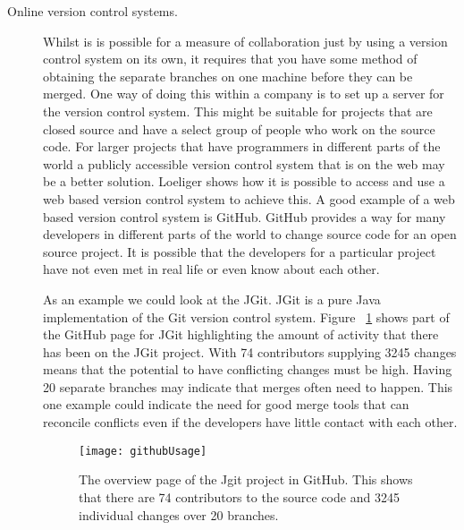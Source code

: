 \begin{description}
  \item [Online version control systems.]  
  Whilst is is possible for a measure of collaboration just by using a version control system on its own, it requires that you have some method of obtaining the separate branches on one machine before they can be merged.
  One way of doing this within a company is to set up a server for the version control system.
  This might be suitable for projects that are closed source and have a select group of people who work on the source code.
  For larger projects that have programmers in different parts of the world a publicly accessible version control system that is on the web may be a better solution.
  Loeliger \cite{Loeliger2006} shows how it is possible to access and use a web based version control system to achieve this.
  A good example of a web based version control system is GitHub.
  GitHub provides a way for many developers in different parts of the world to change source code for an open source project.
  It is possible that the developers for a particular project have not even met in real life or even know about each other.

  As an example we could look at the JGit.
  JGit is a pure Java implementation of the Git version control system.
  Figure ~\ref{fig:bgUsage} shows part of the GitHub page for JGit highlighting the amount of activity that there has been on the JGit project.
  With 74 contributors supplying 3245 changes means that the potential to have conflicting changes must be high. Having 20 separate branches may indicate that merges often need to happen. This one example could indicate the need for good merge tools that can reconcile conflicts even if the developers have little contact with each other.

  \begin{figure}[!t]
   \begin{center}
    \texttt{[image: githubUsage]}
   \end{center}
   \caption{The overview page of the Jgit project in GitHub. This shows that there are 74 contributors to the source code and 3245 individual changes over 20 branches.}
   \label{fig:bgUsage}
  \end{figure}


  
\end{description}

